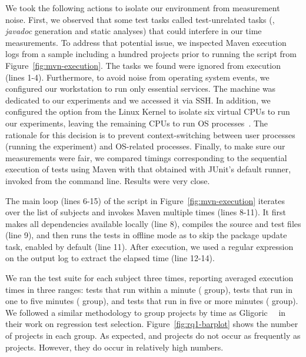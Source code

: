 We took the following actions to isolate our environment from
measurement noise.  First, we observed that some test tasks called
test-unrelated tasks (\eg, \emph{javadoc} generation and static
analyses) that could interfere in our time measurements.  To address
that potential issue, we inspected Maven execution logs from a sample
including a hundred projects prior to running the script from
Figure~\ref{fig:mvn-execution}.  The tasks we found were ignored from
execution (lines 1-4).  Furthermore, to avoid noise from operating
system events, we configured our workstation to run only essential
services.  The machine was dedicated to our experiments and we
accessed it via SSH. In addition, we configured the 
option from the Linux Kernel \cite{linux-kernel} to isolate six
virtual CPUs to run our experiments, leaving the remaining CPUs to run
OS processes~\cite{isolcpus-use}.  The rationale for this decision is
to prevent context-switching between user processes (running the
experiment) and OS-related processes.  Finally, to make sure our
measurements were fair, we compared timings corresponding to the
sequential execution of tests using Maven with that obtained with
JUnit's default  runner, invoked from the command
line.  Results were very close.

The main loop (lines 6-15) of the script in
Figure~\ref{fig:mvn-execution} iterates over the list of subjects and
invokes Maven multiple times (lines 8-11).  It first makes all dependencies available locally
(line 8), compiles the source and test files (line 9), and then runs
the tests in offline mode as to skip the package update task, enabled
by default (line 11). After execution, we used a regular expression on
the output log to extract the elapsed time (line 12-14).



We ran the test suite for each subject three times, reporting averaged
execution times in three ranges: tests that run within a minute
(\shortg{} group), tests that run in one to five minutes (\medg{}
group), and tests that run in five or more minutes (\longg{}
group). We followed a similar methodology to group projects by time as
Gligoric~\etal{}~\cite{gligoric-etal-issta2015} in their work on
regression test selection. Figure~\ref{fig:rq1-barplot} shows the number of projects in
each group.  As expected, \longg{} and \medg{} projects do not occur
as frequently as \shortg{} projects.  However, they do occur in
relatively high numbers.

